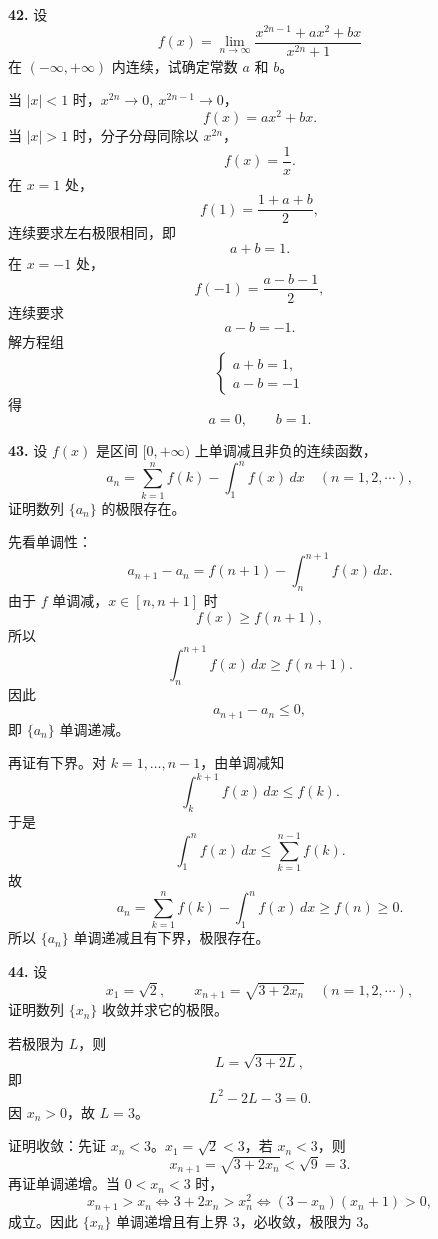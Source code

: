 \begin{problemblock}
\textbf{42.} 设
\[
f(x)=\lim_{n\to\infty}
\frac{x^{2n-1}+ax^2+bx}{x^{2n}+1}
\]
在 \((-\infty,+\infty)\) 内连续，试确定常数 \(a\) 和 \(b\)。
\end{problemblock}

\begin{solutionblock}
当 \(|x|<1\) 时，\(x^{2n}\to0,\ x^{2n-1}\to0\)，
\[
f(x)=ax^2+bx.
\]
当 \(|x|>1\) 时，分子分母同除以 \(x^{2n}\)，
\[
f(x)=\frac1x.
\]
在 \(x=1\) 处，
\[
f(1)=\frac{1+a+b}{2},
\]
连续要求左右极限相同，即
\[
a+b=1.
\]
在 \(x=-1\) 处，
\[
f(-1)=\frac{a-b-1}{2},
\]
连续要求
\[
a-b=-1.
\]
解方程组
\[
\begin{cases}
a+b=1,\\
a-b=-1
\end{cases}
\]
得
\[
a=0,\qquad b=1.
\]
\end{solutionblock}

\begin{problemblock}
\textbf{43.} 设 \(f(x)\) 是区间 \([0,+\infty)\) 上单调减且非负的连续函数，
\[
a_n=\sum_{k=1}^n f(k)-\int_1^n f(x)\,dx\quad(n=1,2,\cdots),
\]
证明数列 \(\{a_n\}\) 的极限存在。
\end{problemblock}

\begin{solutionblock}
先看单调性：
\[
a_{n+1}-a_n
=f(n+1)-\int_n^{n+1}f(x)\,dx.
\]
由于 \(f\) 单调减，\(x\in[n,n+1]\) 时
\[
f(x)\ge f(n+1),
\]
所以
\[
\int_n^{n+1}f(x)\,dx\ge f(n+1).
\]
因此
\[
a_{n+1}-a_n\le0,
\]
即 \(\{a_n\}\) 单调递减。

再证有下界。对 \(k=1,\dots,n-1\)，由单调减知
\[
\int_k^{k+1}f(x)\,dx\le f(k).
\]
于是
\[
\int_1^n f(x)\,dx
\le\sum_{k=1}^{n-1}f(k).
\]
故
\[
a_n=\sum_{k=1}^n f(k)-\int_1^n f(x)\,dx
\ge f(n)\ge0.
\]
所以 \(\{a_n\}\) 单调递减且有下界，极限存在。
\end{solutionblock}

\begin{problemblock}
\textbf{44.} 设
\[
x_1=\sqrt2,\qquad x_{n+1}=\sqrt{3+2x_n}\quad(n=1,2,\cdots),
\]
证明数列 \(\{x_n\}\) 收敛并求它的极限。
\end{problemblock}

\begin{solutionblock}
若极限为 \(L\)，则
\[
L=\sqrt{3+2L},
\]
即
\[
L^2-2L-3=0.
\]
因 \(x_n>0\)，故 \(L=3\)。

证明收敛：先证 \(x_n<3\)。\(x_1=\sqrt2<3\)，若 \(x_n<3\)，则
\[
x_{n+1}=\sqrt{3+2x_n}<\sqrt9=3.
\]
再证单调递增。当 \(0<x_n<3\) 时，
\[
x_{n+1}>x_n
\iff 3+2x_n>x_n^2
\iff (3-x_n)(x_n+1)>0,
\]
成立。因此 \(\{x_n\}\) 单调递增且有上界 3，必收敛，极限为 3。
\end{solutionblock}

